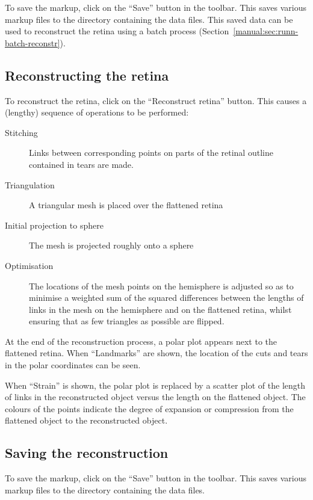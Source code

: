 \documentclass{article}
\begin{document}
To save the markup, click on the ``Save'' button in the toolbar. This
saves various markup files to the directory containing the
data files. This saved data can be used to reconstruct the retina using
a batch process (Section~\ref{manual:sec:runn-batch-reconstr}).

\subsection{Reconstructing the retina}
\label{manual:sec:reconstr-retina}

To reconstruct the retina, click on the ``Reconstruct retina''
button. This causes a (lengthy) sequence of operations to be performed:
\begin{description}
\item[Stitching] Links between corresponding points on parts of the retinal
  outline  contained in tears are made.
\item[Triangulation] A triangular mesh is placed over the flattened retina
\item[Initial projection to sphere ] The mesh is projected roughly
  onto a sphere
\item[Optimisation] The locations of the mesh points on the hemisphere
  is adjusted so as to minimise a weighted sum of the squared
  differences between the lengths of links in the mesh on the
  hemisphere and on the flattened retina, whilst ensuring that as few
  triangles as possible are flipped.
\end{description}

At the end of the reconstruction process, a polar plot appears next to
the flattened retina. When ``Landmarks'' are shown, the location of
the cuts and tears in the polar coordinates can be seen.

When ``Strain'' is shown, the polar plot is replaced by a scatter plot of the
length of links in the reconstructed object versus the length on the
flattened object. The colours of the points indicate the degree of
expansion or compression from the flattened object to the
reconstructed object.

\subsection{Saving the reconstruction}
\label{manual:sec:saving-reconstr}

To save the markup, click on the ``Save'' button in the toolbar. This
saves various markup files to the directory containing the data files.
\end{document}
